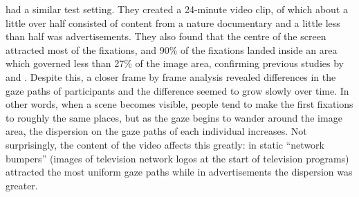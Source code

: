 \documentclass[output=paper]{langsci/langscibook}
\begin{document}
\citet{brasel2008} had a similar test setting. They created a 24-minute video clip, of which about a little over half consisted of content from a nature documentary and a little less than half was advertisements. They also found that the centre of the screen attracted most of the fixations, and 90\% of the fixations landed inside an area which governed less than 27\% of the image area, confirming previous studies by \citet{tosi1997} and \citet{goldstein2007}. Despite this, a closer frame by frame analysis revealed differences in the gaze paths of participants and the difference seemed to grow slowly over time. In other words, when a scene becomes visible, people tend to make the first fixations to roughly the same places, but as the gaze begins to wander around the image area, the dispersion on the gaze paths of each individual increases. Not surprisingly, the content of the video affects this greatly: in \citet{brasel2008} static “network bumpers” (images of television network logos at the start of television programs) attracted the most uniform gaze paths while in advertisements the dispersion was greater. 
\end{document}
